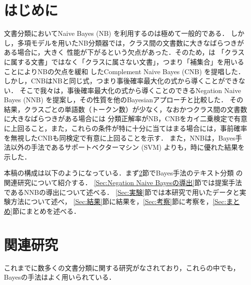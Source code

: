 \documentclass[japanese]{jnlp_1.4}
\begin{document}
\maketitle



\section{はじめに}

文書分類においてNaive Bayes (NB) を利用するのは極めて一般的である．
しかし，多項モデルを用いたNB分類器では，クラス間の文書数に大きなばらつきがある場合に，大きく
性能が下がるという欠点があった．そのため，は
「クラスに属する文書」ではなく「クラスに属さない文書」，つまり「補集合」を用いることによりNBの欠点を緩和
したComplement Naive Bayes (CNB) を提唱した．
しかし，CNBはNBと同じ式，つまり事後確率最大化の式から導くことができない．
そこで我々は，事後確率最大化の式から導くことのできるNegation Naive Bayes (NNB) を提案し，その性質を他のBayesianアプローチと比較した．
その結果，クラスごとの単語数（トークン数）が少なく，なおかつクラス間の文書数に大きなばらつきがある場合には
分類正解率がNB，CNBをカイ二乗検定で有意に上回ること，また，これらの条件が特に十分に当てはまる場合には，事前確率を無視したCNBも同検定で有意に上回ることを示す．
また，NNBは，Bayes手法以外の手法であるサポートベクターマシン (SVM) よりも，時に優れた結果を示した．

本稿の構成は以下のようになっている．まず\ref{Sec:関連研究}節でBayes手法のテキスト分類
の関連研究について紹介する．
\ref{Sec:Negation Naive Bayesの導出}節では提案手法であるNNBの導出について述べる．
\ref{Sec:実験}節では本研究で用いたデータと実験方法について述べ，
\ref{Sec:結果}節に結果を，\ref{Sec:考察}節に考察を，\ref{Sec:まとめ}節にまとめを述べる．



\section{関連研究} \label{Sec:関連研究}

これまでに数多くの文書分類に関する研究がなされており，これらの中でも，Bayesの手法はよく用いられている\cite{持橋}．
\end{document}
